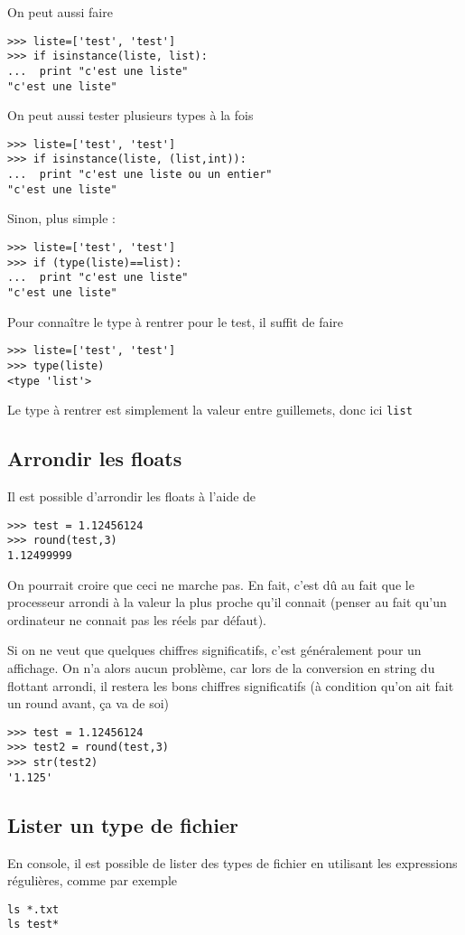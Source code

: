 \documentclass[a4paper,twoside]{article}
\begin{document}
On peut aussi faire
\begin{verbatim}
>>> liste=['test', 'test']
>>> if isinstance(liste, list):
...  print "c'est une liste"
"c'est une liste"
\end{verbatim}

On peut aussi tester plusieurs types à la fois
\begin{verbatim}
>>> liste=['test', 'test']
>>> if isinstance(liste, (list,int)):
...  print "c'est une liste ou un entier"
"c'est une liste"
\end{verbatim}

Sinon, plus simple :
\begin{verbatim}
>>> liste=['test', 'test']
>>> if (type(liste)==list):
...  print "c'est une liste"
"c'est une liste"
\end{verbatim}

Pour connaître le type à rentrer pour le test, il suffit de faire
\begin{verbatim}
>>> liste=['test', 'test']
>>> type(liste)
<type 'list'>
\end{verbatim}
Le type à rentrer est simplement la valeur entre guillemets, donc ici \texttt{list}

\subsection{Arrondir les floats}
Il est possible d'arrondir les floats à l'aide de
\begin{verbatim}
>>> test = 1.12456124
>>> round(test,3)
1.12499999
\end{verbatim}

On pourrait croire que ceci ne marche pas. En fait, c'est dû au fait que le processeur arrondi à la valeur la plus proche qu'il connait (penser au fait qu'un ordinateur ne connait pas les réels par défaut).

Si on ne veut que quelques chiffres significatifs, c'est généralement pour un affichage. On n'a alors aucun problème, car lors de la conversion en string du flottant arrondi, il restera les bons chiffres significatifs (à condition qu'on ait fait un round avant, ça va de soi)
\begin{verbatim}
>>> test = 1.12456124
>>> test2 = round(test,3)
>>> str(test2)
'1.125'
\end{verbatim}

\subsection{Lister un type de fichier}
En console, il est possible de lister des types de fichier en utilisant les expressions régulières, comme par exemple
\begin{verbatim}
ls *.txt
ls test*
\end{verbatim}
\end{document}
